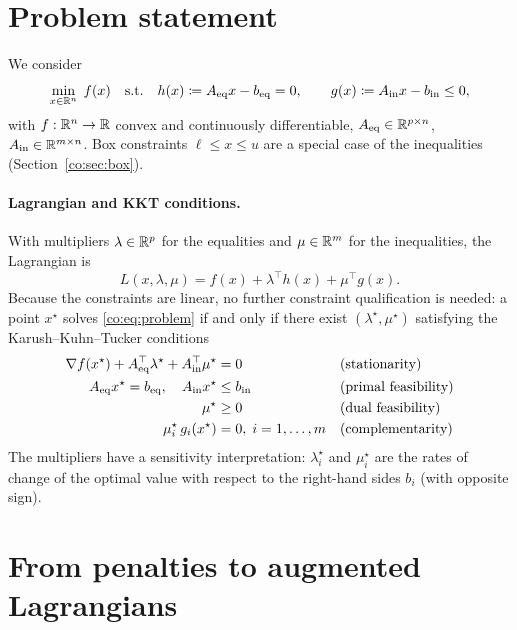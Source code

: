 \section{Problem statement}

We consider
\begin{equation}\label{co:eq:problem}
  \min_{x\in\mathbb{R}^n} \; f(x)
  \quad\text{s.t.}\quad
  h(x) \coloneqq A_{\mathrm{eq}} x - b_{\mathrm{eq}} = 0, \qquad
  g(x) \coloneqq A_{\mathrm{in}} x - b_{\mathrm{in}} \le 0,
\end{equation}
with $f:\mathbb{R}^n\to\mathbb{R}$ convex and continuously differentiable,
$A_{\mathrm{eq}}\in\mathbb{R}^{p\times n}$, $A_{\mathrm{in}}\in\mathbb{R}^{m\times n}$. Box constraints
$\ell \le x \le u$ are a special case of the inequalities
(Section~\ref{co:sec:box}).

\paragraph{Lagrangian and KKT conditions.}
With multipliers $\lambda\in\mathbb{R}^p$ for the equalities and $\mu\in\mathbb{R}^m$ for the
inequalities, the Lagrangian is
\[
  L(x,\lambda,\mu) = f(x) + \lambda^\top h(x) + \mu^\top g(x).
\]
Because the constraints are linear, no further constraint qualification is
needed: a point $x^\star$ solves \eqref{co:eq:problem} if and only if there exist
$(\lambda^\star,\mu^\star)$ satisfying the Karush--Kuhn--Tucker conditions
\begin{align}
  \nabla f(x^\star) + A_{\mathrm{eq}}^\top\lambda^\star + A_{\mathrm{in}}^\top\mu^\star &= 0
    && \text{(stationarity)} \label{co:eq:kkt-stat}\\
  A_{\mathrm{eq}} x^\star = b_{\mathrm{eq}}, \quad A_{\mathrm{in}} x^\star &\le b_{\mathrm{in}}
    && \text{(primal feasibility)} \label{co:eq:kkt-feas}\\
  \mu^\star &\ge 0
    && \text{(dual feasibility)} \\
  \mu^\star_i\, g_i(x^\star) &= 0,\; i=1,\dots,m
    && \text{(complementarity)} \label{co:eq:kkt-comp}
\end{align}
The multipliers have a sensitivity interpretation: $\lambda^\star_i$ and
$\mu^\star_i$ are the rates of change of the optimal value with respect to the
right-hand sides $b_i$ (with opposite sign).

\section{From penalties to augmented Lagrangians}

